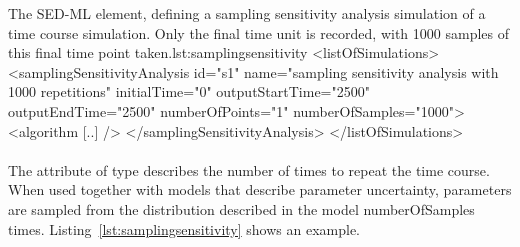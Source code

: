 \begin{myXmlLst}{The SED-ML  element, defining a sampling sensitivity analysis simulation of a time course simulation. Only the final time unit is recorded, with 1000 samples of this final time point taken.}{lst:samplingsensitivity}
<listOfSimulations>
  <samplingSensitivityAnalysis id="s1" name="sampling sensitivity analysis with 1000 repetitions"
      initialTime="0" outputStartTime="2500" outputEndTime="2500" numberOfPoints="1"
      numberOfSamples="1000">
  <algorithm [..] />
 </samplingSensitivityAnalysis>
</listOfSimulations>
\end{myXmlLst}

\paragraph{}
\label{sec:numberOfSamples}

The attribute  of type  describes the number of times to repeat the time course. When used together with models that describe parameter uncertainty, parameters are sampled from the distribution described in the model numberOfSamples times. Listing~\ref{lst:samplingsensitivity} shows an example.
